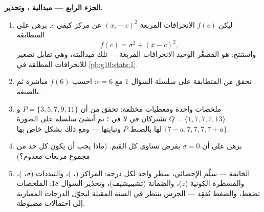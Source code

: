 \begin{problem}
\medskip
\noindent\textbf{الجزء الرابع --- ميدالية ، وتحذير.}
\begin{enumerate}[resume]
  \item ليكن $f(c)$  الانحرافات المربعة
        $(x_i - c)^2$ عن مركز كيفي $c$. برهن على
        المتطابقة
        \[
        f(c) = \sigma^2 + (\bar x - c)^2 ,
        \]
        واستنتج:  هو المصغِّر الوحيد 
        الانحرافات المربعة --- تلك ميداليته، وهي تقابل تصغير 
        للانحرافات المطلقة في
        \cref{pb:g10:stats:1}.
  \item تحقق من المتطابقة على سلسلة السؤال 1 مع
        $c = 6$: احسب $f(6)$ مباشرة ثم بالصيغة.
  \item ملخصات واحدة ومعطيات مختلفة: تحقق من أن
        $P = \{3, 5, 7, 9, 11\}$ و $Q = \{1, 7, 7, 7, 13\}$
        تشتركان في  لا في ؛ ثم
        أنشئ سلسلة على الصورة
        $\{7 - a, 7, 7, 7, 7 + a\}$ لها بالضبط 
        $P$ وتباينها --- ومع ذلك بشكل خاص بها.
  \item برهن على أن $\sigma = 0$ يفرض تساوي كل القيم. (ماذا
        يجب أن يكون كل حد من مجموع مربعات معدوم؟)
  \item الخاتمة --- سلّم الإحصائي، سطر واحد لكل
        درجة: المراكز (، )، والتبددات ($\sigma$، )،
        والمسطرة الكونية ($z$)، والضمانة (تشيبيشيف)،
        وتحذير السؤال 18: الملخصات تضغط،
        والضغط يُفقِد ---  الجرس ينتظر في السنة المقبلة
        ليحوّل الدرجات المعيارية إلى احتمالات مضبوطة.
\end{enumerate}
\end{problem}
